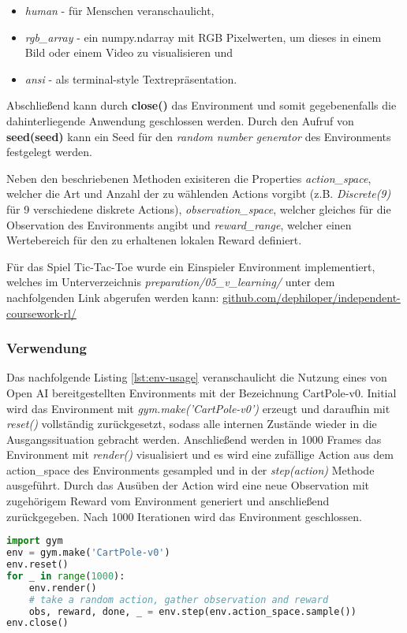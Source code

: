 \documentclass[11pt]{scrartcl}
\begin{document}
\begin{itemize}
\itemsep0pt
\item \textit{human} - für Menschen veranschaulicht, 
\item \textit{rgb\_array} - ein numpy.ndarray mit RGB Pixelwerten, um dieses in einem Bild oder einem 
Video zu visualisieren und 
\item \textit{ansi} - als terminal-style Textrepräsentation.
\end{itemize}
\noindent
Abschließend kann durch \textbf{close()} das Environment und somit gegebenenfalls die 
dahinterliegende Anwendung geschlossen werden. Durch den Aufruf von 
\textbf{seed(seed)} kann ein Seed für den \textit{random number generator}
des Environments festgelegt werden.


Neben den beschriebenen Methoden exisiteren die Properties \textit{action\_space}, welcher die
Art und Anzahl der zu wählenden Actions vorgibt (z.B. \textit{Discrete(9)} für 9 verschiedene
diskrete Actions), \textit{observation\_space}, welcher gleiches für die Observation des
Environments angibt und \textit{reward\_range}, welcher einen Wertebereich für den zu erhaltenen
lokalen Reward definiert.

Für das Spiel Tic-Tac-Toe wurde ein Einspieler Environment implementiert, welches im
Unterverzeichnis \textit{preparation/05\_v\_learning/} unter dem nachfolgenden Link abgerufen
werden kann: \url{github.com/dephiloper/independent-coursework-rl/}


\subsubsection{Verwendung}
Das nachfolgende Listing \autoref{lst:env-usage} veranschaulicht die Nutzung eines von Open AI
bereitgestellten Environments mit der Bezeichnung CartPole-v0. Initial wird das Environment
mit \textit{gym.make('CartPole-v0')} erzeugt und daraufhin mit \textit{reset()} vollständig
zurückgesetzt, sodass alle internen Zustände wieder in die Ausgangssituation gebracht werden. 
Anschließend werden in 1000 Frames das Environment mit \textit{render()} visualisiert und es
wird eine zufällige Action aus dem action\_space des Environments gesampled und in der
\textit{step(action)} Methode ausgeführt. Durch das Ausüben der Action wird eine neue
Observation mit zugehörigem Reward vom Environment generiert und anschließend zurückgegeben.
Nach 1000 Iterationen wird das Environment geschlossen. 
\begin{lstlisting}[language=Python, caption=environment usage, label=lst:env-usage]
import gym
env = gym.make('CartPole-v0')
env.reset()
for _ in range(1000):
    env.render()
    # take a random action, gather observation and reward
    obs, reward, done, _ = env.step(env.action_space.sample())
env.close()
\end{lstlisting}
\end{document}
